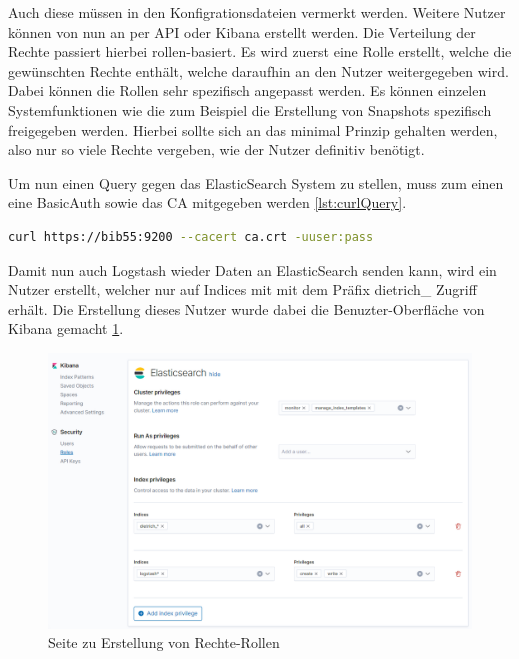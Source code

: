 Auch diese müssen in den Konfigrationsdateien vermerkt werden. Weitere Nutzer können von nun an per API oder Kibana erstellt werden. Die Verteilung der Rechte passiert hierbei rollen-basiert. Es wird zuerst eine Rolle erstellt, welche die gewünschten Rechte enthält, welche daraufhin an den Nutzer weitergegeben wird. Dabei können die Rollen sehr spezifisch angepasst werden. Es können einzelen Systemfunktionen wie die zum Beispiel die Erstellung von Snapshots spezifisch freigegeben werden. Hierbei sollte sich an das minimal Prinzip gehalten werden, also nur so viele Rechte vergeben, wie der Nutzer definitiv benötigt.

Um nun einen Query gegen das ElasticSearch System zu stellen, muss zum einen eine BasicAuth sowie das CA mitgegeben werden \ref{lst:curlQuery}.

\begin{lstlisting}[language=BASH, frame=single, label={lst:curlQuery}] 
	curl https://bib55:9200 --cacert ca.crt -uuser:pass
\end{lstlisting}

Damit nun auch Logstash wieder Daten an ElasticSearch senden kann, wird ein Nutzer erstellt, welcher nur auf Indices mit mit dem Präfix dietrich\_ Zugriff erhält. Die Erstellung dieses Nutzer wurde dabei die Benuzter-Oberfläche von Kibana gemacht \ref{img:kibanaRoles}. 

\begin{figure}
	\centering
	\includegraphics[width=1\linewidth]{images/setup/kibana_roles.png}
	\caption{Seite zu Erstellung von Rechte-Rollen}
	\label{img:kibanaRoles}
\end{figure}